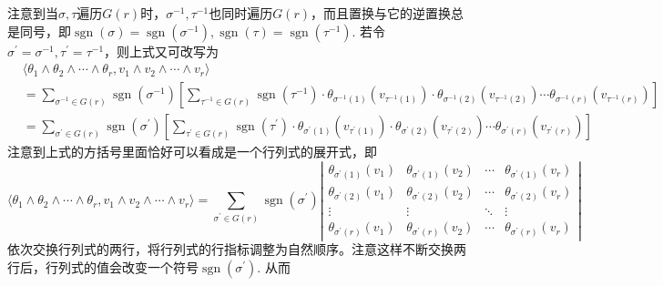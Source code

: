 注意到当$\sigma,\tau$遍历$G(r)$时，$\sigma^{-1},\tau^{-1}$也同时遍历$G(r)$，而且置换与它的逆置换总是同号，即$\operatorname{sgn}(\sigma)=\operatorname{sgn}(\sigma^{-1}),\operatorname{sgn}(\tau)=\operatorname{sgn}(\tau^{-1})$. 若令$\sigma^{\prime}=\sigma^{-1},\tau^{\prime}=\tau^{-1}$，则上式又可改写为
\[
\begin{split}
	&\bigl\langle\theta_{1}\wedge \theta_{2}\wedge\cdots\wedge \theta_{r} ,v_{1}\wedge v_{2}\wedge \cdots\wedge v_{r} \bigr\rangle\\
	&=\sum_{\sigma^{-1}\in G(r)}\operatorname{sgn}(\sigma^{-1})\left[\sum_{\tau^{-1}\in G(r)}\operatorname{sgn}(\tau^{-1})\cdot  \theta_{\sigma^{-1}(1)}\left(v_{\tau^{-1}(1)}\right)\cdot   \theta_{\sigma^{-1}(2)}\left(v_{\tau^{-1}(2)}\right)\cdots \theta_{\sigma^{-1}(r)}\left(v_{\tau^{-1}(r)}\right)\right]\\
	&=\sum_{\sigma^{\prime}\in G(r)}\operatorname{sgn}(\sigma^{\prime})\left[\sum_{\tau^{\prime}\in G(r)}\operatorname{sgn}(\tau^{\prime})\cdot  \theta_{\sigma^{\prime}(1)}\left(v_{\tau^{\prime}(1)}\right)\cdot   \theta_{\sigma^{\prime}(2)}\left(v_{\tau^{\prime}(2)}\right)\cdots \theta_{\sigma^{\prime}(r)}\left(v_{\tau^{\prime}(r)}\right)\right]
\end{split}
\]
注意到上式的方括号里面恰好可以看成是一个行列式的展开式，即
\[
\bigl\langle\theta_{1}\wedge \theta_{2}\wedge\cdots\wedge \theta_{r} ,v_{1}\wedge v_{2}\wedge \cdots\wedge v_{r} \bigr\rangle=\sum_{\sigma^{\prime}\in G(r)}\operatorname{sgn}(\sigma^{\prime}) \left|\begin{array}{cccc}\theta_{\sigma^{\prime}(1)}(v_{1}) & \theta_{\sigma^{\prime}(1)}(v_{2}) & \cdots & \theta_{\sigma^{\prime}(1)}(v_{r}) \\ \theta_{\sigma^{\prime}(2)}(v_{1}) & \theta_{\sigma^{\prime}(2)}(v_{2}) & \cdots & \theta_{\sigma^{\prime}(2)}(v_{r}) \\ \vdots & \vdots & \ddots& \vdots \\ \theta_{\sigma^{\prime}(r)}(v_{1}) & \theta_{\sigma^{\prime}(r)}(v_{2}) & \cdots & \theta_{\sigma^{\prime}(r)}(v_{r})\end{array}\right|
\]
依次交换行列式的两行，将行列式的行指标调整为自然顺序。注意这样不断交换两行后，行列式的值会改变一个符号$\operatorname{sgn}(\sigma^{\prime})$. 从而

